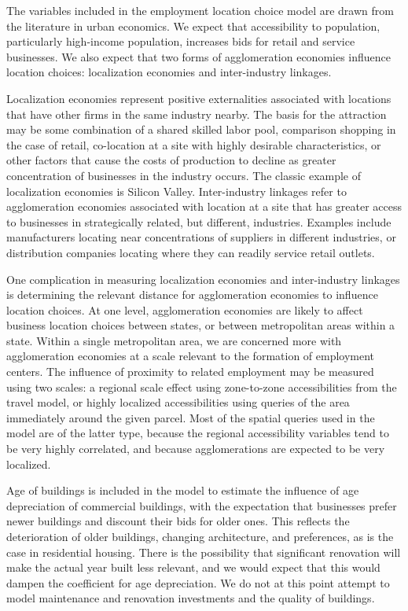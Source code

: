 The variables included in the employment location choice model are
drawn from the literature in urban economics.  We expect that
accessibility to population, particularly high-income population,
increases bids for retail and service businesses.  We also expect
that two forms of agglomeration economies influence location
choices: localization economies and inter-industry linkages.

Localization economies represent positive externalities associated
with locations that have other firms in the same industry nearby.
The basis for the attraction may be some combination of a shared
skilled labor pool, comparison shopping in the case of retail,
co-location at a site with highly desirable characteristics, or
other factors that cause the costs of production to decline as
greater concentration of businesses in the industry occurs.  The
classic example of localization economies is Silicon Valley.
Inter-industry linkages refer to agglomeration economies
associated with location at a site that has greater access to
businesses in strategically related, but different, industries.
Examples include manufacturers locating near concentrations of
suppliers in different industries, or distribution companies
locating where they can readily service retail outlets.

One complication in measuring localization economies and
inter-industry linkages is determining the relevant distance for
agglomeration economies to influence location choices.  At one
level, agglomeration economies are likely to affect business
location choices between states, or between metropolitan areas
within a state.  Within a single metropolitan area, we are
concerned more with agglomeration economies at a scale relevant to
the formation of employment centers.  The influence of proximity
to related employment may be measured using two scales: a regional
scale effect using zone-to-zone accessibilities from the travel
model, or highly localized accessibilities using queries of the
area immediately around the given parcel.  Most of the spatial
queries used in the model are of the latter type, because the
regional accessibility variables tend to be very highly
correlated, and because agglomerations are expected to be very
localized.

Age of buildings is included in the model to estimate the
influence of age depreciation of commercial buildings, with the
expectation that businesses prefer newer buildings and discount
their bids for older ones.  This reflects the deterioration of
older buildings, changing architecture, and preferences, as is the
case in residential housing.  There is the possibility that
significant renovation will make the actual year built less
relevant, and we would expect that this would dampen the
coefficient for age depreciation.  We do not at this point attempt
to model maintenance and renovation investments and the quality of
buildings.

